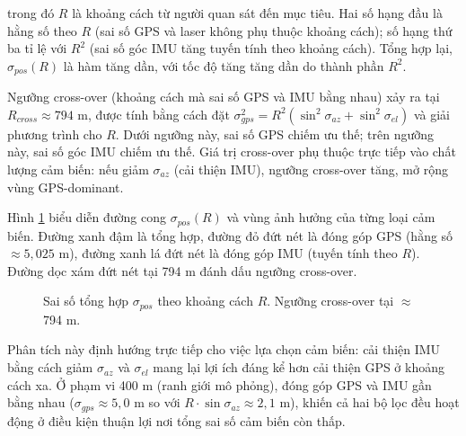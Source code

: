 trong đó $R$ là khoảng cách từ người quan sát đến mục tiêu. Hai số hạng đầu là hằng số theo $R$ (sai số GPS và laser không phụ thuộc khoảng cách); số hạng thứ ba tỉ lệ với $R^2$ (sai số góc IMU tăng tuyến tính theo khoảng cách). Tổng hợp lại, $\sigma_{pos}(R)$ là hàm tăng dần, với tốc độ tăng tăng dần do thành phần $R^2$.

Ngưỡng cross-over (khoảng cách mà sai số GPS và IMU bằng nhau) xảy ra tại $R_{cross} \approx 794$ m, được tính bằng cách đặt $\sigma_{gps}^2 = R^2(\sin^2\sigma_{az} + \sin^2\sigma_{el})$ và giải phương trình cho $R$. Dưới ngưỡng này, sai số GPS chiếm ưu thế; trên ngưỡng này, sai số góc IMU chiếm ưu thế. Giá trị cross-over phụ thuộc trực tiếp vào chất lượng cảm biến: nếu giảm $\sigma_{az}$ (cải thiện IMU), ngưỡng cross-over tăng, mở rộng vùng GPS-dominant.

Hình \ref{fig:sigma-vs-range} biểu diễn đường cong $\sigma_{pos}(R)$ và vùng ảnh hưởng của từng loại cảm biến. Đường xanh đậm là tổng hợp, đường đỏ đứt nét là đóng góp GPS (hằng số $\approx 5{,}025$ m), đường xanh lá đứt nét là đóng góp IMU (tuyến tính theo $R$). Đường dọc xám đứt nét tại 794 m đánh dấu ngưỡng cross-over.

\begin{figure}[H]
\centering
{}
\caption{Sai số tổng hợp $\sigma_{pos}$ theo khoảng cách $R$. Ngưỡng cross-over tại $\approx$794 m.}
\label{fig:sigma-vs-range}
\end{figure}

Phân tích này định hướng trực tiếp cho việc lựa chọn cảm biến: cải thiện IMU bằng cách giảm $\sigma_{az}$ và $\sigma_{el}$ mang lại lợi ích đáng kể hơn cải thiện GPS ở khoảng cách xa. Ở phạm vi 400 m (ranh giới mô phỏng), đóng góp GPS và IMU gần bằng nhau ($\sigma_{gps} \approx 5{,}0$ m so với $R \cdot \sin\sigma_{az} \approx 2{,}1$ m), khiến cả hai bộ lọc đều hoạt động ở điều kiện thuận lợi nơi tổng sai số cảm biến còn thấp.

